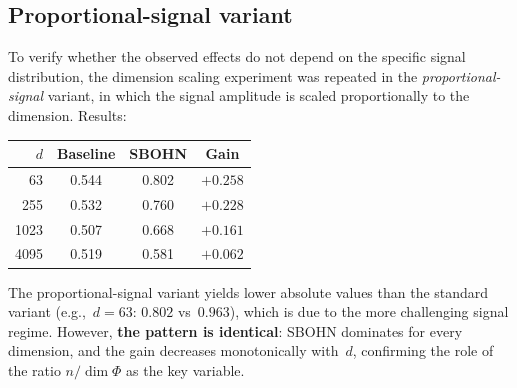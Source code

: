\subsection{Proportional-signal variant}

To verify whether the observed effects do not depend on the specific signal distribution, the dimension scaling experiment was repeated in the \emph{proportional-signal} variant, in which the signal amplitude is scaled proportionally to the dimension. Results:

\begin{center}
\begin{tabular}{rccc}
\toprule
$d$ & Baseline & SBOHN & Gain \\
\midrule
63 & 0.544 & 0.802 & $+0.258$ \\
255 & 0.532 & 0.760 & $+0.228$ \\
1023 & 0.507 & 0.668 & $+0.161$ \\
4095 & 0.519 & 0.581 & $+0.062$ \\
\bottomrule
\end{tabular}
\end{center}

The proportional-signal variant yields lower absolute values than the standard variant (e.g.,~$d=63$: $0.802$ vs~$0.963$), which is due to the more challenging signal regime. However, \textbf{the pattern is identical}: SBOHN dominates for every dimension, and the gain decreases monotonically with~$d$, confirming the role of the ratio $n/\dim\Phi$ as the key variable.
